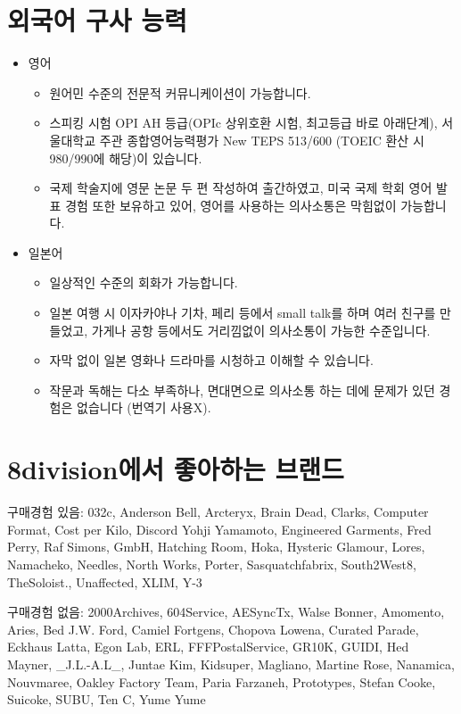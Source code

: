 \section*{외국어 구사 능력}
\begin{itemize}
    \item 영어
          \begin{itemize}
              \item 원어민 수준의 전문적 커뮤니케이션이 가능합니다.
              \item 스피킹 시험 OPI AH 등급(OPIc 상위호환 시험, 최고등급 바로 아래단계), 서울대학교 주관 종합영어능력평가 New TEPS 513/600 (TOEIC 환산 시 980/990에 해당)이 있습니다.
              \item 국제 학술지에 영문 논문 두 편 작성하여 출간하였고, 미국 국제 학회 영어 발표 경험 또한 보유하고 있어, 영어를 사용하는 의사소통은 막힘없이 가능합니다.
          \end{itemize}
    \item 일본어
          \begin{itemize}
              \item 일상적인 수준의 회화가 가능합니다.
              \item 일본 여행 시 이자카야나 기차, 페리 등에서 small talk를 하며 여러 친구를 만들었고, 가게나 공항 등에서도 거리낌없이 의사소통이 가능한 수준입니다.
              \item 자막 없이 일본 영화나 드라마를 시청하고 이해할 수 있습니다.
              \item 작문과 독해는 다소 부족하나, 면대면으로 의사소통 하는 데에 문제가 있던 경험은 없습니다 (번역기 사용X).
          \end{itemize}
\end{itemize}

\section*{8division에서 좋아하는 브랜드}
\noindent
구매경험 있음: 032c, Anderson Bell, Arcteryx, Brain Dead, Clarks, Computer Format, Cost per Kilo, Discord Yohji Yamamoto, Engineered Garments, Fred Perry, Raf Simons, GmbH, Hatching Room, Hoka, Hysteric Glamour, Lores, Namacheko, Needles, North Works, Porter, Sasquatchfabrix, South2West8, TheSoloist., Unaffected, XLIM, Y-3

\noindent
구매경험 없음: 2000Archives, 604Service, AESyncTx, Walse Bonner, Amomento, Aries, Bed J.W. Ford, Camiel Fortgens, Chopova Lowena, Curated Parade, Eckhaus Latta, Egon Lab, ERL, FFFPostalService, GR10K, GUIDI, Hed Mayner, \_J.L.-A.L\_, Juntae Kim, Kidsuper, Magliano, Martine Rose, Nanamica, Nouvmaree, Oakley Factory Team, Paria Farzaneh, Prototypes, Stefan Cooke, Suicoke, SUBU, Ten C, Yume Yume

